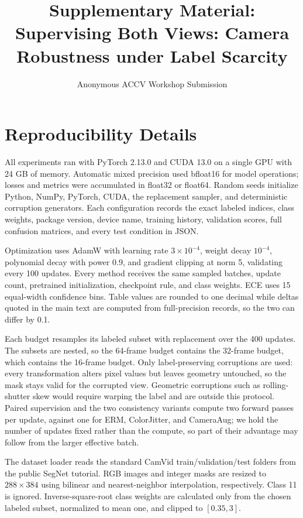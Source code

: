 \documentclass[runningheads]{llncs}
\begin{document}
\title{Supplementary Material:\\Supervising Both Views: Camera Robustness under Label Scarcity}
\author{Anonymous ACCV Workshop Submission}
\maketitle

\section{Reproducibility Details}

All experiments ran with PyTorch 2.13.0 and CUDA 13.0 on a single GPU with
24 GB of memory. Automatic mixed precision used
bfloat16 for model operations; losses and metrics were accumulated in float32
or float64. Random seeds initialize Python, NumPy, PyTorch, CUDA, the replacement
sampler, and deterministic corruption generators. Each configuration records the exact
labeled indices, class weights, package version, device name, training history,
validation scores, full confusion matrices, and every test condition in JSON.

Optimization uses AdamW with learning rate $3\times10^{-4}$, weight decay
$10^{-4}$, polynomial decay with power 0.9, and gradient clipping at norm 5,
validating every 100 updates. Every method receives the same sampled batches,
update count, pretrained initialization, checkpoint rule, and class weights.
ECE uses 15 equal-width confidence bins. Table values are rounded to one
decimal while deltas quoted in the main text are computed from full-precision
records, so the two can differ by 0.1.

Each budget resamples its labeled subset with replacement over the 400 updates.
The subsets are nested, so the 64-frame budget contains the 32-frame budget,
which contains the 16-frame budget. Only label-preserving corruptions are used:
every transformation alters pixel values but leaves geometry untouched, so the
mask stays valid for the corrupted view. Geometric corruptions such as
rolling-shutter skew would require warping the label and are outside this
protocol. Paired supervision and the two consistency variants compute two
forward passes per update, against one for ERM, ColorJitter, and CameraAug; we
hold the number of updates fixed rather than the compute, so part of their
advantage may follow from the larger effective batch.

The dataset loader reads the standard CamVid train/validation/test folders from
the public SegNet tutorial. RGB images and integer masks are resized to
$288\times384$ using bilinear and nearest-neighbor interpolation, respectively.
Class 11 is ignored. Inverse-square-root class weights are calculated only from
the chosen labeled subset, normalized to mean one, and clipped to $[0.35,3]$.
\end{document}
